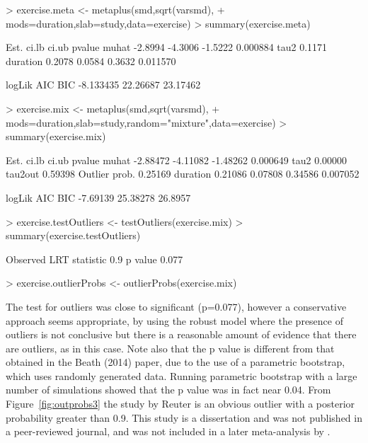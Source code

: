 \documentclass{article}
\begin{document}
\begin{Schunk}
\begin{Sinput}
> exercise.meta <- metaplus(smd,sqrt(varsmd),
+       mods=duration,slab=study,data=exercise)
> summary(exercise.meta)
\end{Sinput}
\begin{Soutput}
            Est.   ci.lb   ci.ub   pvalue
muhat    -2.8994 -4.3006 -1.5222 0.000884
tau2      0.1171                         
duration  0.2078  0.0584  0.3632 0.011570

     logLik      AIC      BIC
  -8.133435 22.26687 23.17462
\end{Soutput}
\begin{Sinput}
> exercise.mix <- metaplus(smd,sqrt(varsmd),
+       mods=duration,slab=study,random="mixture",data=exercise)
> summary(exercise.mix)
\end{Sinput}
\begin{Soutput}
                  Est.    ci.lb    ci.ub   pvalue
muhat         -2.88472 -4.11082 -1.48262 0.000649
tau2           0.00000                           
tau2out        0.59398                           
Outlier prob.  0.25169                           
duration       0.21086  0.07808  0.34586 0.007052

    logLik      AIC     BIC
  -7.69139 25.38278 26.8957
\end{Soutput}
\begin{Sinput}
> exercise.testOutliers <- testOutliers(exercise.mix)
> summary(exercise.testOutliers)
\end{Sinput}
\begin{Soutput}
Observed LRT statistic 0.9 p value 0.077
\end{Soutput}
\begin{Sinput}
> exercise.outlierProbs <- outlierProbs(exercise.mix)
\end{Sinput}
\end{Schunk}

The test for outliers was close to significant (p=0.077), however a conservative approach seems appropriate, by using the robust model where the presence of outliers is not conclusive but there is a reasonable amount of evidence that there are outliers, as in this case. Note also that the p value is different from that obtained in the Beath (2014) paper, due to the use of a parametric bootstrap, which uses randomly generated data. Running parametric bootstrap with a large number of simulations showed that the p value was in fact near 0.04. From Figure~\ref{fig:outprobs3} the study by Reuter is an obvious outlier with a posterior probability greater than 0.9. This study is a dissertation and was not published in a peer-reviewed journal, and was not included in a later meta-analysis by \citet{Krogh2011}.
\end{document}
